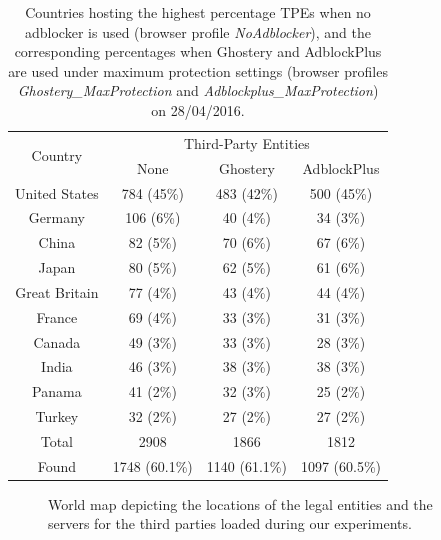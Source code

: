 \documentclass[compsoc, conference, letterpaper, 10pt, times]{IEEEtran}
\begin{document}
  \begin{table}
  \centering
  \begin{tabular}{|c|c|c|c|}
  \hline
  \multirow{2}{*}{Country} & \multicolumn{3}{|c|}{Third-Party Entities} \\
  \cline{2-4}
  & \scriptsize{None} & \scriptsize{Ghostery} & \scriptsize{AdblockPlus} \\
  \hline
  United States & 784 (45\%) & 483 (42\%) & 500 (45\%) \\
  Germany & 106 (6\%) & 40 (4\%) & 34 (3\%) \\
  China & 82 (5\%) & 70 (6\%) & 67 (6\%) \\
  Japan & 80 (5\%) & 62 (5\%) & 61 (6\%) \\
  Great Britain & 77 (4\%) & 43 (4\%) & 44 (4\%) \\
  France & 69 (4\%) & 33 (3\%) & 31 (3\%) \\
  Canada & 49 (3\%) & 33 (3\%) & 28 (3\%) \\
  India & 46 (3\%) & 38 (3\%) & 38 (3\%) \\
  Panama & 41 (2\%) & 32 (3\%) & 25 (2\%) \\
  Turkey & 32 (2\%) & 27 (2\%) & 27 (2\%) \\
  \hline
  Total & 2908 & 1866 & 1812 \\
  Found & 1748 (60.1\%) & 1140 (61.1\%) & 1097 (60.5\%) \\
  \hline
  \end{tabular}
  \caption{Countries hosting the highest percentage TPEs when no adblocker is used (browser profile \textit{NoAdblocker}), and the corresponding percentages when Ghostery and AdblockPlus are used under maximum protection settings (browser profiles \textit{Ghostery\_MaxProtection} and \textit{Adblockplus\_MaxProtection}) on 28/04/2016.}
  \label{table:top_10_third_party_countries}
  \end{table}



\begin{figure}[!t]
 \centering
   \hfill
 \caption{World map depicting the locations of the legal entities and the servers for the third parties loaded during our experiments.}
\end{figure}
\end{document}

